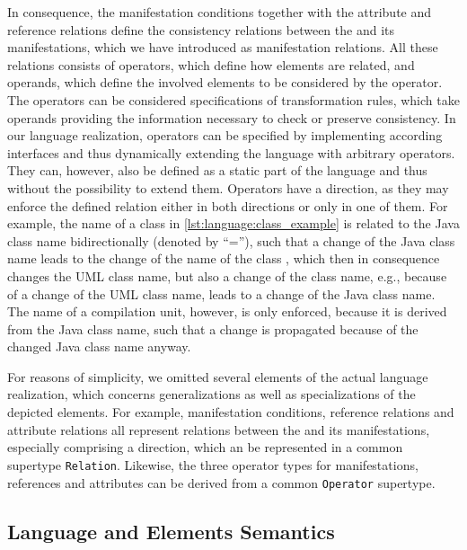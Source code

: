 In consequence, the manifestation conditions together with the attribute and reference relations define the consistency relations between the \commonality and its manifestations, which we have introduced as manifestation relations.
All these relations consists of operators, which define how elements are related, and operands, which define the involved elements to be considered by the operator. 
The operators can be considered specifications of transformation rules, which take operands providing the information necessary to check or preserve consistency.
In our language realization, operators can be specified by implementing according interfaces and thus dynamically extending the language with arbitrary operators.
They can, however, also be defined as a static part of the language and thus without the possibility to extend them.
Operators have a direction, as they may enforce the defined relation either in both directions or only in one of them.
For example, the name of a class in \autoref{lst:language:class_example} is related to the Java class name bidirectionally (denoted by \enquote{=}), such that a change of the Java class name leads to the change of the name of the class \commonality, which then in consequence changes the \gls{UML} class name, but also a change of the class \commonality name, e.g., because of a change of the \gls{UML} class name, leads to a change of the Java class name.
The name of a compilation unit, however, is only enforced, because it is derived from the Java class name, such that a change is propagated because of the changed Java class name anyway.

For reasons of simplicity, we omitted several elements of the actual language realization, which concerns generalizations as well as specializations of the depicted elements.
For example, manifestation conditions, reference relations and attribute relations all represent relations between the \commonality and its manifestations, especially comprising a direction, which an be represented in a common supertype \texttt{Relation}.
Likewise, the three operator types for manifestations, references and attributes can be derived from a common \texttt{Operator} supertype.


\subsection{Language and Elements Semantics}

